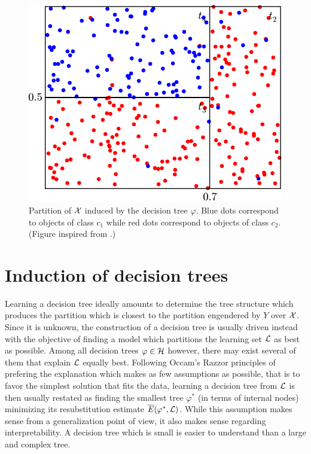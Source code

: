 \begin{figure}
    \centering
    \includegraphics[scale=0.5]{figures/ch3_partition.pdf}
    \caption{Partition of ${\cal X}$ induced by the decision tree $\varphi$.
             Blue dots correspond to objects of class $c_1$ while red dots correspond
             to objects of class $c_2$. (Figure inspired from \citet{breiman:1984}.)}
    \label{fig:3:partition}
\end{figure}


\section{Induction of decision trees}
\label{sec:3:induction}

Learning a decision tree ideally amounts to determine the tree structure which
produces the partition which is closest to the partition engendered by $Y$ over
${\cal X}$. Since it is unknown, the construction of a decision tree is usually
driven instead with the objective of finding a model which partitions the
learning set ${\cal L}$ as best as possible. Among all decision trees $\varphi
\in {\cal H}$ however, there may exist several of them that explain ${\cal L}$
equally best. Following Occam's Razzor principles of prefering the explanation
which makes as few assumptions as possible, that is to favor the simplest
solution that fits the data, learning a decision tree from ${\cal L}$ is then
usually restated as finding the smallest tree $\varphi^*$ (in terms of internal nodes) minimizing its
resubstitution estimate $\overline{E}(\varphi^*, {\cal L})$. While this
assumption makes sense from a generalization point of view, it also makes
sense regarding interpretability. A decision tree which is small is easier
to understand than a large and complex tree.

